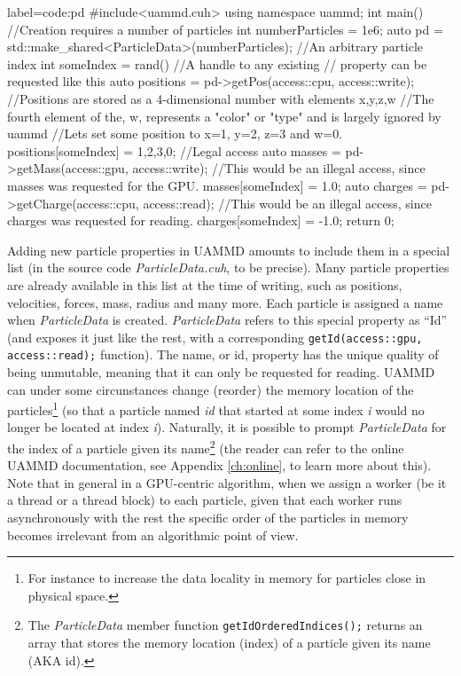 \documentclass[ twoside,openright,titlepage,numbers=noenddot,%
headinclude,footinclude,cleardoublepage=empty,abstract=on,
BCOR=5mm,paper=a4,fontsize=11pt, dvipsnames
]{scrreprt}
\def\ucpp{uammd_cpp_lexer.py:UAMMDCppLexer -x}
\newcommand{\uammd}{\gls{UAMMD}\xspace}
\begin{document}
\begin{code2}
  {label=code:pd}
#include<uammd.cuh>
using namespace uammd; 
int main(){
  //Creation requires a number of particles
  int numberParticles = 1e6;
  auto pd = std::make_shared<ParticleData>(numberParticles);
  //An arbitrary particle index
  int someIndex = rand()%
  //A handle to any existing 
  // property can be requested like this
  auto positions = pd->getPos(access::cpu, access::write);
  //Positions are stored as a 4-dimensional number with elements x,y,z,w
  //The fourth element of the, w, represents a "color" or "type" and is largely ignored by uammd
  //Lets set some position to x=1, y=2, z=3 and w=0.
  positions[someIndex] = {1,2,3,0}; //Legal access
  auto masses = pd->getMass(access::gpu, access::write);
  //This would be an illegal access, since masses was requested for the GPU.
  masses[someIndex] = 1.0;
  auto charges = pd->getCharge(access::cpu, access::read);
  //This would be an illegal access, since charges was requested for reading.
  charges[someIndex] = -1.0;
  return 0;
}
\end{code2}
Adding new particle properties in \uammd amounts to include them in a special list (in the source code \emph{ParticleData.cuh}, to be precise). Many particle properties are already available in this list at the time of writing, such as positions, velocities, forces, mass, radius and many more. Each particle is assigned a name when \emph{ParticleData} is created. \emph{ParticleData} refers to this special property as ``Id'' (and exposes it just like the rest, with a corresponding \texttt{getId(access::gpu, access::read);} function). The name, or id, property has the unique quality of being unmutable, meaning that it can only be requested for reading. \uammd can under some circunstances change (reorder) the memory location of the particles\footnote{For instance to increase the data locality in memory for particles close in physical space.} (so that a particle named \emph{id} that started at some index \emph{i} would no longer be located at index \emph{i}). Naturally, it is possible to prompt \emph{ParticleData} for the index of a particle given its name\footnote{The \emph{ParticleData} member function \texttt{getIdOrderedIndices();} returns an array that stores the memory location (index) of a particle given its name (AKA id).} (the reader can refer to the online \uammd documentation, see Appendix \ref{ch:online}, to learn more about this). Note that in general in a GPU-centric algorithm, when we assign a worker (be it a thread or a thread block) to each particle, given that each worker runs asynchronously with the rest the specific order of the particles in memory becomes irrelevant from an algorithmic point of view.
\end{document}
